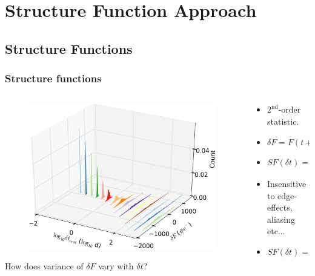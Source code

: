 \documentclass[hyperref={pdfpagelabels=false}]{beamer}
\begin{document}
\section{Structure Function Approach}

\subsection{Structure Functions}

\begin{frame}
\frametitle{Structure functions}
  \begin{columns}
    \centering
    \begin{column}{0.6\textwidth}
      \begin{figure}
        \includegraphics[scale=0.0875]{images/kplr006932990-1stIncr_3D.jpg}
      \end{figure}
      \centering
      {\tiny How does variance of $\delta F$ vary with $\delta t$?}
    \end{column}
    \begin{column}{0.4\textwidth}
       \begin{itemize}
       \item $2^{\mathrm{nd}}$-order statistic.
       \item $\delta F = F(t+\delta t) - F(t)$
       \item $SF(\delta t) = \langle \vert \delta F \vert^{2} \rangle_{t}$
       \item Insensitive to edge-effects, aliasing etc...
       \item $SF(\delta t) = 2ACVF(0) - 2ACVF(\delta t)$
       \end{itemize}
    \end{column}
  \end{columns}
\end{frame}
\end{document}
